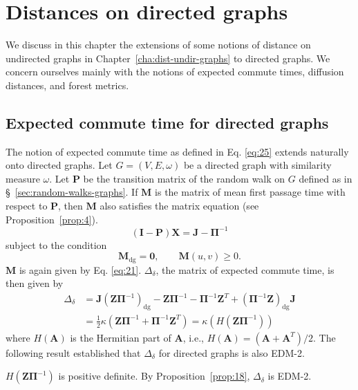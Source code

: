 \chapter{Distances on directed graphs}
\label{cha:dist-direct-graphs}
We discuss in this chapter the extensions of some notions of
distance on undirected graphs in Chapter~\ref{cha:dist-undir-graphs}
to directed graphs. We concern ourselves mainly with the notions of
expected commute times, diffusion distances, and forest metrics. 
\section{Expected commute time for directed graphs}
\label{sec:expect-comm-time-1}
The notion of expected commute time as defined in
Eq. \eqref{eq:25} extends naturally onto directed graphs. Let $G =
(V,E,\omega)$ be a directed graph with similarity measure
$\omega$. Let $\mathbf{P}$ be the transition matrix of the random walk
on $G$ defined as in \S~\ref{sec:random-walks-graphs}. 
If $\mathbf{M}$ is the matrix of mean first passage time with respect
to $\mathbf{P}$, then $\mathbf{M}$ also satisfies the matrix equation
(see Proposition~\ref{prop:4}). 
\begin{equation*}
  (\mathbf{I} - \mathbf{P})\mathbf{X} = \mathbf{J} - \bm{\Pi}^{-1}
\end{equation*}
subject to the condition 
\begin{equation*}
  \mathbf{M}_{\mathrm{dg}} = \mathbf{0}, \qquad \mathbf{M}(u,v) \geq
  0.   
\end{equation*}
$\mathbf{M}$ is again given by
Eq. \eqref{eq:21}. $\Delta_{\delta}$, the matrix of expected commute
time, is then given by
\begin{equation}
  \label{eq:73}
  \begin{split}
    \Delta_\delta &= \mathbf{J}(\mathbf{Z}\bm{\Pi}^{-1})_{\mathrm{dg}}
    - \mathbf{Z}\bm{\Pi}^{-1} - \bm{\Pi}^{-1}\mathbf{Z}^{T} +
    (\bm{\Pi}^{-1}\mathbf{Z})_{\mathrm{dg}}\mathbf{J} \\ \ &=
    \tfrac{1}{2}\kappa(\mathbf{Z}\bm{\Pi}^{-1} +
    \mathbf{\Pi}^{-1}\mathbf{Z}^{T}) =
    \kappa(H(\mathbf{Z}\bm{\Pi}^{-1}))
  \end{split}
\end{equation}
where $H(\mathbf{A})$ is the Hermitian part of $\mathbf{A}$, i.e.,
$H(\mathbf{A}) = (\mathbf{A} + \mathbf{A}^{T})/2$. 
% 
The following result established that $\Delta_{\delta}$ for directed
graphs is also EDM-2.
\begin{proposition}
  \label{prop:19}
  $H(\mathbf{Z}\bm{\Pi}^{-1})$ is
  positive definite. By Proposition~\ref{prop:18},
  $\Delta_{\delta}$ is EDM-2.  
\end{proposition}

